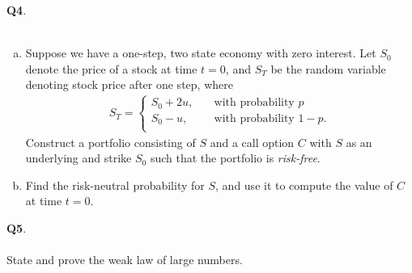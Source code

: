 \documentclass[12pt, oneside]{amsart}
\begin{document}
\newpage
\noindent
\textbf{Q4}. \\ \\ 
\noindent
\begin{enumerate}[(a)]
    \item
			Suppose we have a one-step, two state economy with zero interest.
			Let $S_{0}$ denote the price of a stock at time $t=0$,
			and $S_{T}$ be the random variable
			denoting stock price after one step, where 
			\begin{equation*}
			\begin{split}
				S_{T} = \begin{cases}
					S_{0} + 2u, \quad & \text{with probability } p \\
					S_{0} - u, \quad & \text{with probability } 1-p. \\
				\end{cases}
			\end{split}
			\end{equation*}
			Construct a portfolio consisting of $S$ and a call option $C$ with $S$
			as an underlying and strike $S_{0}$
			such that the portfolio is \emph{risk-free}.
			\vspace{4in}
		\item Find the risk-neutral probability for $S$, and use it to compute
			the value of $C$ at time $t=0$. 

		\end{enumerate}

\newpage

\noindent \textbf{Q5}. \\ \\ 
State and prove the weak law of large numbers.
\end{document}
